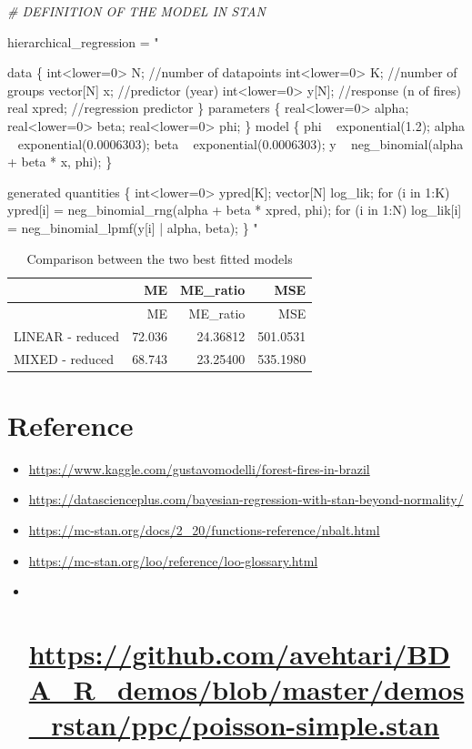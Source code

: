 \documentclass[]{article}
\newenvironment{Shaded}{\begin{snugshade}}{\end{snugshade}}
\newcommand{\StringTok}[1]{\textcolor[rgb]{0.31,0.60,0.02}{#1}}
\newcommand{\CommentTok}[1]{\textcolor[rgb]{0.56,0.35,0.01}{\textit{#1}}}
\newcommand{\NormalTok}[1]{#1}
\begin{document}
\begin{Shaded}
\begin{Highlighting}[]
\CommentTok{# DEFINITION OF THE MODEL IN STAN}

\NormalTok{hierarchical_regression =}\StringTok{ "}

\StringTok{data \{}
\StringTok{  int<lower=0> N;     //number of datapoints}
\StringTok{  int<lower=0> K;     //number of groups}
\StringTok{  vector[N] x;        //predictor (year)}
\StringTok{  int<lower=0> y[N];  //response (n of fires)}
\StringTok{  real xpred;         //regression predictor}
\StringTok{\}}
\StringTok{parameters \{}
\StringTok{  real<lower=0> alpha;}
\StringTok{  real<lower=0> beta;}
\StringTok{  real<lower=0> phi;}
\StringTok{\}}
\StringTok{model \{}
\StringTok{  phi ~ exponential(1.2);}
\StringTok{  alpha ~ exponential(0.0006303);}
\StringTok{  beta ~ exponential(0.0006303);}
\StringTok{  y ~ neg_binomial(alpha + beta * x, phi);}
\StringTok{\}}

\StringTok{generated quantities \{}
\StringTok{  int<lower=0> ypred[K];}
\StringTok{  vector[N] log_lik;}
\StringTok{  }
\StringTok{  for (i in 1:K) }
\StringTok{    ypred[i] = neg_binomial_rng(alpha + beta * xpred, phi);}
\StringTok{  }
\StringTok{  for (i in 1:N) }
\StringTok{    log_lik[i] = neg_binomial_lpmf(y[i] | alpha, beta);}
\StringTok{\}}
\StringTok{"}
\end{Highlighting}
\end{Shaded}

\begin{longtable}[]{@{}lrrr@{}}
\caption{Comparison between the two best fitted models}\tabularnewline
\toprule
& ME & ME\_ratio & MSE\tabularnewline
\midrule
\endfirsthead
\toprule
& ME & ME\_ratio & MSE\tabularnewline
\midrule
\endhead
LINEAR - reduced & 72.036 & 24.36812 & 501.0531\tabularnewline
MIXED - reduced & 68.743 & 23.25400 & 535.1980\tabularnewline
\bottomrule
\end{longtable}

\section{Reference}\label{reference}

\begin{itemize}
\item
  \url{https://www.kaggle.com/gustavomodelli/forest-fires-in-brazil}
\item
  \url{https://datascienceplus.com/bayesian-regression-with-stan-beyond-normality/}
\item
  \url{https://mc-stan.org/docs/2_20/functions-reference/nbalt.html}
\item
  \url{https://mc-stan.org/loo/reference/loo-glossary.html}
\item ~
  \section{\texorpdfstring{\url{https://github.com/avehtari/BDA_R_demos/blob/master/demos_rstan/ppc/poisson-simple.stan}}{https://github.com/avehtari/BDA\_R\_demos/blob/master/demos\_rstan/ppc/poisson-simple.stan}}\label{httpsgithub.comavehtaribda_r_demosblobmasterdemos_rstanppcpoisson-simple.stan}
\end{itemize}
\end{document}
